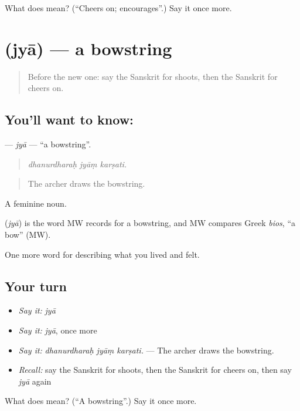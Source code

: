 \begin{tcolorbox}[breakable,colback=teal!4,colframe=teal!35!black,title={Before you move on}]
What does  mean? (\textquotedblleft{}Cheers on; encourages\textquotedblright{}.) Say it once more.
\end{tcolorbox}
\section[\texorpdfstring{\sk{ज्या} (jyā)}{ज्या (jyā)}]{ (jyā) — a bowstring}

\label{lesson:SA-C527-jya}



\begin{quote}
Before the new one: say the Sanskrit for shoots, then the Sanskrit for cheers on.
\end{quote}

\subsection*{You'll want to know: }
\textbf{} — \emph{jyā} — \textquotedblleft{}a bowstring\textquotedblright{}.

\begin{quote}
  
\end{quote}

\begin{quote}
\emph{dhanurdharaḥ jyāṃ karṣati.}
\end{quote}

\begin{quote}
The archer draws the bowstring.
\end{quote}

A feminine noun.

\begin{cousinweb}
\textbf{} (\emph{jyā}) is the word MW records for a bowstring, and MW compares Greek \emph{bios}, \textquotedblleft{}a bow\textquotedblright{} (MW).
\end{cousinweb}

\begin{grammarlens}[title={What you've built}]
One more word for describing what you lived and felt.
\end{grammarlens}

\subsection*{Your turn}
\begin{itemize}
\raggedright
  \item \emph{Say it:} \emph{jyā}
  \item \emph{Say it:} \emph{jyā}, once more
  \item \emph{Say it:} \emph{dhanurdharaḥ jyāṃ karṣati.} — The archer draws the bowstring.
  \item \emph{Recall:} say the Sanskrit for shoots, then the Sanskrit for cheers on, then say \emph{jyā} again
\end{itemize}

\begin{tcolorbox}[breakable,colback=teal!4,colframe=teal!35!black,title={Before you move on}]
What does  mean? (\textquotedblleft{}A bowstring\textquotedblright{}.) Say it once more.
\end{tcolorbox}

